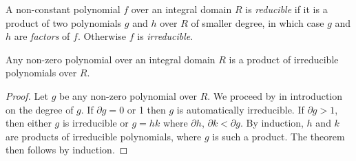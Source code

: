 
%
%    




\begin{definition}
     A non-constant polynomial $f$ over an integral domain $R$ is \textit{reducible} if it is a product of two polynomials $g$ and $h$ over $R$ of smaller degree, in which case $g$ and $h$ are \textit{factors} of $f$. Otherwise $f$ is \textit{irreducible}. 
\end{definition}

\begin{theorem}
    Any non-zero polynomial over an integral domain $R$ is a product of irreducible polynomials over $R$.
\end{theorem}

\begin{proof}
    Let $g$ be any non-zero polynomial over $R$. We proceed by in introduction on the degree of $g$. If $\partial g = 0$ or 1 then $g$ is automatically irreducible. If $\partial g > 1$, then either $g$ is irreducible or $g = hk$ where $\partial h$, $\partial k < \partial g$. By induction, $h$ and $k$ are products of irreducible polynomials, where $g$ is such a product. The theorem then follows by induction.
\end{proof}

